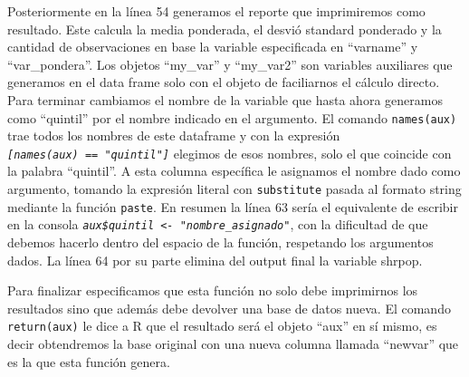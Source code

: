 \documentclass[
]{book}
\begin{document}
Posteriormente en la línea 54 generamos el reporte que imprimiremos como resultado. Este calcula la media ponderada, el desvió standard ponderado y la cantidad de observaciones en base la variable especificada en ``varname'' y ``var\_pondera''. Los objetos ``my\_var'' y ``my\_var2'' son variables auxiliares que generamos en el data frame solo con el objeto de faciliarnos el cálculo directo. Para terminar cambiamos el nombre de la variable que hasta ahora generamos como ``quintil'' por el nombre indicado en el argumento. El comando \texttt{names(aux)} trae todos los nombres de este dataframe y con la expresión \emph{\texttt{{[}names(aux)\ ==\ "quintil"{]}}} elegimos de esos nombres, solo el que coincide con la palabra ``quintil''. A esta columna específica le asignamos el nombre dado como argumento, tomando la expresión literal con \texttt{substitute} pasada al formato string mediante la función \texttt{paste}. En resumen la línea 63 sería el equivalente de escribir en la consola \emph{\texttt{aux\$quintil\ \textless{}-\ "nombre\_asignado"}}, con la dificultad de que debemos hacerlo dentro del espacio de la función, respetando los argumentos dados. La línea 64 por su parte elimina del output final la variable shrpop.

Para finalizar especificamos que esta función no solo debe imprimirnos los resultados sino que además debe devolver una base de datos nueva. El comando \texttt{return(aux)} le dice a R que el resultado será el objeto ``aux'' en sí mismo, es decir obtendremos la base original con una nueva columna llamada ``newvar'' que es la que esta función genera.
\end{document}
